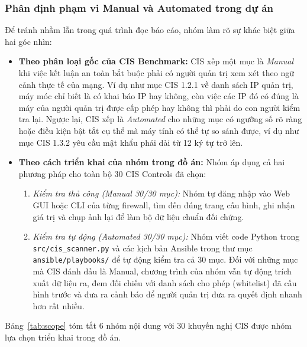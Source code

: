 \documentclass[12pt,a4paper]{article}
\begin{document}
\subsubsection{Phân định phạm vi Manual và Automated trong dự án}
\noindent Để tránh nhầm lẫn trong quá trình đọc báo cáo, nhóm làm rõ sự khác biệt giữa hai góc nhìn:
\begin{itemize}
    \item \textbf{Theo phân loại gốc của CIS Benchmark:} CIS xếp một mục là \textit{Manual} khi việc kết luận an toàn bắt buộc phải có người quản trị xem xét theo ngữ cảnh thực tế của mạng. Ví dụ như mục CIS 1.2.1 về danh sách IP quản trị, máy móc chỉ biết là có khai báo IP hay không, còn việc các IP đó có đúng là máy của người quản trị được cấp phép hay không thì phải do con người kiểm tra lại. Ngược lại, CIS xếp là \textit{Automated} cho những mục có ngưỡng số rõ ràng hoặc điều kiện bật tắt cụ thể mà máy tính có thể tự so sánh được, ví dụ như mục CIS 1.3.2 yêu cầu mật khẩu phải dài từ 12 ký tự trở lên.
    \item \textbf{Theo cách triển khai của nhóm trong đồ án:} Nhóm áp dụng cả hai phương pháp cho toàn bộ 30 CIS Controls đã chọn:
    \begin{enumerate}
        \item \emph{Kiểm tra thủ công (Manual 30/30 mục):} Nhóm tự đăng nhập vào Web GUI hoặc CLI của từng firewall, tìm đến đúng trang cấu hình, ghi nhận giá trị và chụp ảnh lại để làm bộ dữ liệu chuẩn đối chứng.
        \item \emph{Kiểm tra tự động (Automated 30/30 mục):} Nhóm viết code Python trong \texttt{src/cis\_scanner.py} và các kịch bản Ansible trong thư mục \texttt{ansible/playbooks/} để tự động kiểm tra cả 30 mục. Đối với những mục mà CIS đánh dấu là Manual, chương trình của nhóm vẫn tự động trích xuất dữ liệu ra, đem đối chiếu với danh sách cho phép (whitelist) đã cấu hình trước và đưa ra cảnh báo để người quản trị đưa ra quyết định nhanh hơn rất nhiều.
    \end{enumerate}
\end{itemize}

\noindent Bảng~\ref{tab:scope} tóm tắt 6 nhóm nội dung với 30 khuyến nghị CIS được nhóm lựa chọn triển khai trong đồ án.
\end{document}
